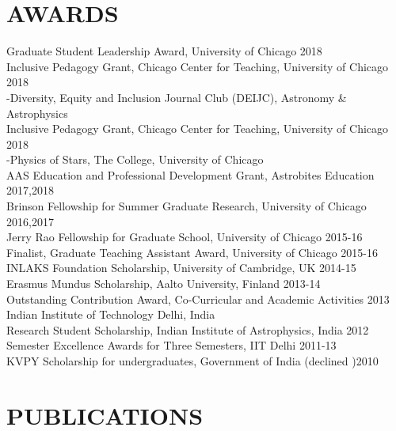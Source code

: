 \documentclass[margin]{res}
\begin{document}
\begin{resume}
\section{AWARDS}
Graduate Student Leadership Award, University of Chicago \hfill 2018\\
Inclusive Pedagogy Grant, Chicago Center for Teaching, University of Chicago \hfill 2018\\
-Diversity, Equity and Inclusion Journal Club (DEIJC), Astronomy \& Astrophysics\\
Inclusive Pedagogy Grant, Chicago Center for Teaching, University of Chicago \hfill 2018\\
-Physics of Stars, The College, University of Chicago\\
AAS Education and Professional Development Grant, Astrobites Education \hfill 2017,2018\\
Brinson Fellowship for Summer Graduate Research, University of Chicago \hfill 2016,2017\\
Jerry Rao Fellowship for Graduate School, University of Chicago \hfill 2015-16\\
Finalist, Graduate Teaching Assistant Award, University of Chicago \hfill 2015-16\\
INLAKS Foundation Scholarship, University of Cambridge, UK \hfill 2014-15\\
Erasmus Mundus Scholarship, Aalto University, Finland \hfill 2013-14\\
Outstanding Contribution Award, Co-Curricular and Academic Activities \hfill 2013 \\
Indian Institute of Technology Delhi, India\\
Research Student Scholarship, Indian Institute of Astrophysics, India \hfill 2012\\
Semester Excellence Awards for Three Semesters, IIT Delhi \hfill 2011-13\\
KVPY Scholarship for undergraduates, Government of India (declined )\hfill 2010\\

\section{PUBLICATIONS}


\end{resume}
\end{document}
